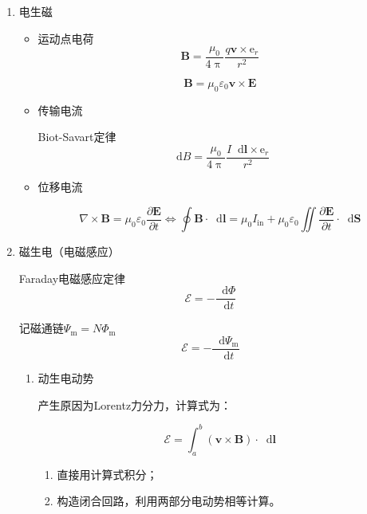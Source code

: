 \documentclass[UTF8,fontset=fandol,zihao=5]{ctexart}
\newcommand{\ee}{\mathrm{e}}
\newcommand{\vect}[1]{\bm{#1}}
\newcommand{\dif}{\mathop{}\!\mathrm{d}}
\newcommand{\EE}{\mathcal{E}}
\begin{document}
\begin{enumerate}
  \item 电生磁
  
  \begin{itemize}
    \item 运动点电荷
    \[
    \vect B = \frac{\mu_0}{4\uppi}\frac{q\vect v\times\vect \ee_r}{r^2}
    \]

\noindent\begin{methodbox}[运动电荷产生的电磁场关系]
\[
\vect B=\mu_0\varepsilon_0\vect v\times\vect E
\]
\end{methodbox}

    \item 传输电流
    
    Biot-Savart定律
    \[
    \dif B = \frac{\mu_0}{4\uppi}\frac{I\dif \vect l\times\vect{\ee}_r}{r^2}
    \]

    \item 位移电流

    \[
    \nabla\times\vect{B} = \mu_0\varepsilon_0\frac{\partial\vect{E}}{\partial t}
    \Leftrightarrow \oint \vect{B}\cdot\dif \vect{l}
    = \mu_0 I_{\mathrm{in}}
    +\mu_0\varepsilon_0
    \iint \frac{\partial\vect{E}}{\partial t} \cdot\dif \vect{S}
    \]

  \end{itemize}

  \item 磁生电（电磁感应）
  
  Faraday电磁感应定律
  \[
  \EE = - \frac{\dif\varPhi}{\dif t}
  \]

  \begin{methodbox}[载流螺线管Faraday电磁感应定律]
  记磁通链$\varPsi_{\mathrm{m}}=N\varPhi_{\mathrm{m}}$
  \[
  \EE = -\frac{\dif \varPsi_{\mathrm{m}}}{\dif t}
  \]
  \end{methodbox}
  
  \begin{enumerate}[label=(\arabic*)]
    \item 动生电动势

    产生原因为Lorentz力分力，计算式为：

    \[
    \EE = \int_{a}^{b} (\vect v \times \vect B) \cdot \dif \vect l
    \]

    \begin{methodbox}[【题型】动生电动势计算]
      \begin{enumerate}[label=\arabic*.]
        \item 直接用计算式积分；
        \item 构造闭合回路，利用两部分电动势相等计算。
      \end{enumerate}
    \end{methodbox}


\end{enumerate}
\end{enumerate}
\end{document}
